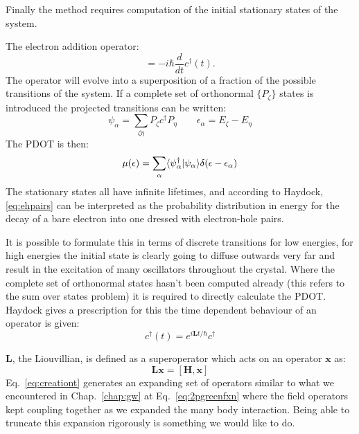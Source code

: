 Finally the method requires computation of the initial stationary states of the system.

The electron addition operator:
%
\begin{equation}
[H, c^{\dagger}(t)] = -i\hbar \frac{d}{dt} c^{\dagger}(t).
\end{equation}
%
The operator will evolve into a superposition of a fraction of the 
possible transitions of the system. If a complete set of orthonormal $\{P_{\zeta}\}$ 
states is introduced the projected transitions can be written:
%
\begin{equation}
\psi_{\alpha} = \sum_{\zeta\eta} P_{\zeta}c^{\dagger}P_{\eta} \qquad \epsilon_{\alpha} = E_{\zeta} - E_{\eta}
\end{equation}
%
The PDOT is then:
%
\begin{equation}
\label{eq:ehpairs}
\mu(\epsilon) = \sum_{\alpha} \langle\psi_{\alpha}^{\dagger}|\psi_{\alpha}\rangle \delta(\epsilon-\epsilon_{\alpha})
\end{equation}
%
The stationary states all have infinite lifetimes, and according to Haydock, \ref{eq:ehpairs} can
be interpreted as the probability distribution in energy for the decay of a bare electron into one dressed
with electron-hole pairs.

It is possible to formulate this in terms of discrete transitions for low energies, for high energies
the initial state is clearly going to diffuse outwards very far and result in the excitation of 
many oscillators throughout the crystal. Where the complete set of orthonormal states
hasn't been computed already (this refers to the sum over states problem) it is required to directly
calculate the PDOT. Haydock gives a prescription for this the time dependent behaviour of
an operator is given:
%
\begin{equation}
\label{eq:creationt}
c^{\dagger}(t) = e^{i\mathbf{L}t/\hbar} c^{\dagger}
\end{equation}
%

$\mathbf{L}$, the Liouvillian, is defined as a superoperator which
acts on an operator $\mathbf{x}$ as:
%
\begin{equation}
\mathbf{L} \mathbf{x} = [\mathbf{H}, \mathbf{x}]
\end{equation}
%
Eq.~\ref{eq:creationt} generates an expanding set of operators similar to what we encountered
in Chap.~\ref{chap:gw} at Eq.~\ref{eq:2pgreenfxn} where the field operators kept coupling
together as we expanded the many body interaction. Being able to truncate this expansion
rigorously is something we would like to do.

